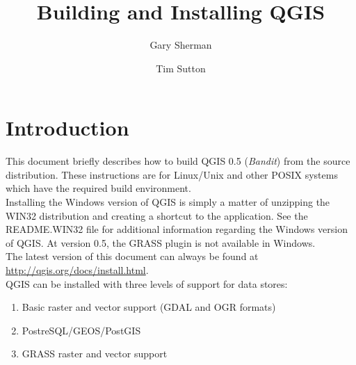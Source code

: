 \documentclass[a4paper,10pt]{article}
\title{Building and Installing QGIS}
\author{Gary Sherman \and Tim Sutton}
\begin{document}
\setlength{\parindent}{0in}

\maketitle
\tableofcontents



\section{Introduction}\label{label_introduction}
This document briefly describes how to build QGIS 0.5 (\textit{Bandit}) from the source distribution. These instructions are for Linux/Unix and other POSIX systems which have the required build environment.\\


Installing the Windows version of QGIS is simply a matter of unzipping the WIN32 distribution and creating a shortcut to the application. See the README.WIN32 file for additional information regarding the Windows version of QGIS. At version 0.5, the GRASS plugin is not available in Windows.\\




The latest version of this document can always be found at \url{http://qgis.org/docs/install.html}.\\

QGIS can be installed with three levels of support for data stores:
\begin{enumerate}
\item Basic raster and vector support (GDAL and OGR formats)
\item PostreSQL/GEOS/PostGIS 
\item GRASS raster and vector support
\end{enumerate} 
\end{document}

